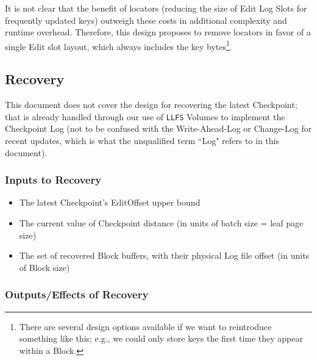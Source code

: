 \documentclass[11pt]{article}
\begin{document}
It is not clear that the benefit of locators (reducing the size of
Edit Log Slots for frequently updated keys) outweigh these costs in
additional complexity and runtime overhead.  Therefore, this design
proposes to remove locators in favor of a single Edit slot layout,
which always includes the key bytes\footnote{There are several design
options available if we want to reintroduce something like this; e.g.,
we could only store keys the first time they appear within a Block.}.
\fi{}

\subsection{Recovery}

This document does not cover the design for recovering the latest
Checkpoint; that is already handled through our use of \texttt{LLFS}
Volumes to implement the Checkpoint Log (not to be confused with the
Write-Ahead-Log or Change-Log for recent updates, which is what the
unqualified term ``Log" refers to in this document).

\subsubsection{Inputs to Recovery}

\begin{itemize}
	\item The latest Checkpoint's EditOffset upper bound
	\item The current value of Checkpoint distance (in units of
          batch size = leaf page size)
	\item The set of recovered Block buffers, with their physical
          Log file offset (in units of Block size)
\end{itemize}

\subsubsection{Outputs/Effects of Recovery}
\end{document}
